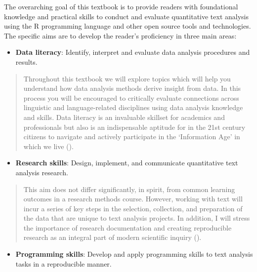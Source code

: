\documentclass[
  letterpaper,
]{latex/krantz}
\providecommand{\tightlist}{%
  \setlength{\itemsep}{0pt}\setlength{\parskip}{0pt}}\usepackage{longtable,booktabs,array}
\theoremstyle{definition}
\theoremstyle{remark}
\begin{document}
The overarching goal of this textbook is to provide readers with
foundational knowledge and practical skills to conduct and evaluate
quantitative text analysis using the R programming language and other
open source tools and technologies. The specific aims are to develop the
reader's proficiency in three main areas:

\begin{itemize}
\tightlist
\item
  \textbf{Data literacy}: Identify, interpret and
  evaluate data analysis procedures and results.
\end{itemize}

\begin{quote}
Throughout this textbook we will explore topics which will help you
understand how data analysis methods derive insight from data. In this
process you will be encouraged to critically evaluate connections across
linguistic and language-related disciplines using data analysis
knowledge and skills. Data literacy is an invaluable skillset for
academics and professionals but also is an indispensable aptitude for in
the 21st century citizens to navigate and actively participate in the
`Information Age' in which we live ().
\end{quote}

\begin{itemize}
\tightlist
\item
  \textbf{Research skills}: Design, implement, and communicate
  quantitative text analysis research.
\end{itemize}

\begin{quote}
This aim does not differ significantly, in spirit, from common learning
outcomes in a research methods course. However, working with text will
incur a series of key steps in the selection, collection, and
preparation of the data that are unique to text analysis projects. In
addition, I will stress the importance of research documentation and
creating reproducible research as an integral part of modern scientific
inquiry ().
\end{quote}

\begin{itemize}
\tightlist
\item
  \textbf{Programming skills}: Develop and apply programming skills to
  text analysis tasks in a reproducible manner.
\end{itemize}
\end{document}
